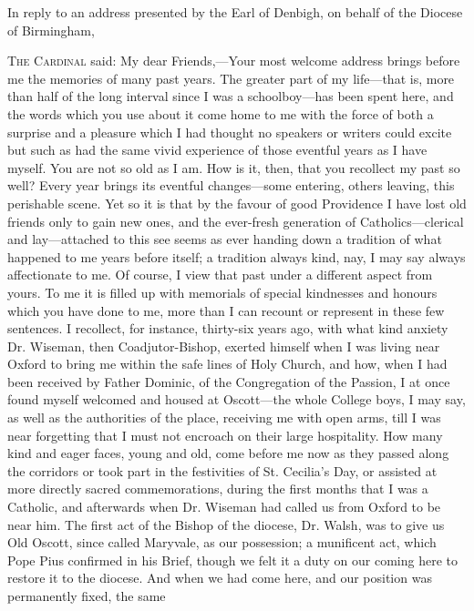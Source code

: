 
In reply to an address presented by the Earl of
Denbigh, on behalf of the Diocese of Birmingham,

T\textsc{he} C\textsc{ardinal}
said: My dear Friends,—Your most welcome address brings before me
the memories of many past years. The greater part of my life—that
is, more than half of the long interval since I was a schoolboy—has
been spent here, and the words which you use about it come home to me
with the force of both a surprise and a pleasure which I had thought
no speakers or writers could excite but such as had the same
vivid experience of those eventful years as I have myself. You are not
so old as I am. How is it, then, that you recollect my past so well?
Every year brings its eventful changes—some entering, others
leaving, this perishable scene. Yet so it is that by the favour of
good Providence I have lost old friends only to gain new ones, and the
ever-fresh generation of Catholics—clerical and lay—attached to
this see seems as ever handing down a tradition of what happened to me
years before itself; a tradition always kind, nay, I may say always
affectionate to me. Of course, I view that past under a different
aspect from yours. To me it is filled up with memorials of special
kindnesses and honours which you have done to me, more than I can
recount or represent in these few sentences. I recollect, for
instance, thirty-six years ago, with what kind anxiety Dr. Wiseman,
then Coadjutor-Bishop, exerted himself when I was living near Oxford
to bring me within the safe lines of Holy Church, and how, when I had
been received by Father Dominic, of the Congregation of the Passion, I
at once found myself welcomed and housed at Oscott—the whole College
boys, I may say, as well as the authorities of the place, receiving me
with open arms, till I was near forgetting that I must not encroach on
their large hospitality. How many kind and eager faces, young and old,
come before me now as they passed along the corridors or took part in
the festivities of St. Cecilia's Day, or assisted at more directly
sacred commemorations, during the first months that I was a Catholic,
and afterwards when Dr. Wiseman had called us from Oxford to be near
him. The first act of the Bishop of the diocese, Dr. Walsh, was to
give us Old Oscott, since called Maryvale, as our possession; a
munificent act, which Pope Pius confirmed in his Brief, though we felt
it a duty on our coming here to restore it to the diocese. And when we
had come here, and our position was permanently fixed, the same
